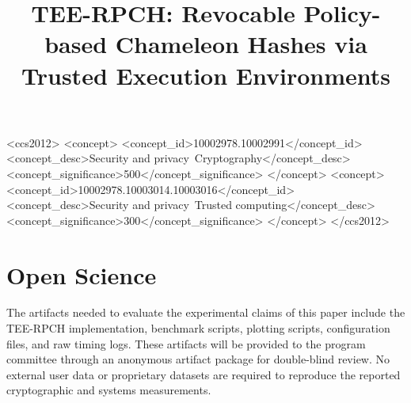 \documentclass[sigconf]{acmart} %
\begin{document}
\title[TEE-RPCH]{TEE-RPCH: Revocable Policy-based Chameleon Hashes via Trusted Execution Environments} %


\renewcommand{\shortauthors}{Anonymous}

\begin{abstract}

\end{abstract}

\begin{CCSXML} %
<ccs2012>
 <concept>
  <concept_id>10002978.10002991</concept_id>
  <concept_desc>Security and privacy~Cryptography</concept_desc>
  <concept_significance>500</concept_significance>
 </concept>
 <concept>
  <concept_id>10002978.10003014.10003016</concept_id>
  <concept_desc>Security and privacy~Trusted computing</concept_desc>
  <concept_significance>300</concept_significance>
 </concept>
</ccs2012>
\end{CCSXML}



\maketitle







% 

\FloatBarrier



\FloatBarrier
\appendix %

\section{Open Science} %

The artifacts needed to evaluate the experimental claims of this paper include the TEE-RPCH implementation, benchmark scripts, plotting scripts, configuration files, and raw timing logs. These artifacts will be provided to the program committee through an anonymous artifact package for double-blind review. No external user data or proprietary datasets are required to reproduce the reported cryptographic and systems measurements.
\end{document}
